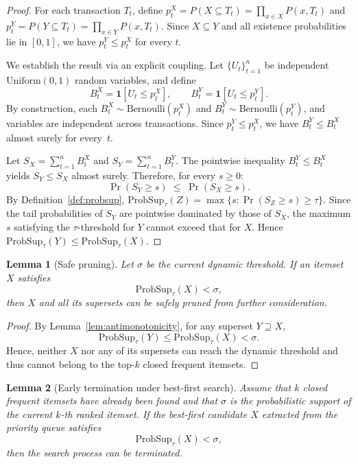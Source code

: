 \documentclass[10pt,letterpaper]{article}
\newtheorem{lemma}{Lemma}
\begin{document}
\begin{proof}
For each transaction $T_t$, define $p_t^X = P(X \subseteq T_t) = \prod_{x \in X} P(x, T_t)$ and $p_t^Y = P(Y \subseteq T_t) = \prod_{x \in Y} P(x, T_t)$. Since $X \subseteq Y$ and all existence probabilities lie in $[0,1]$, we have $p_t^Y \le p_t^X$ for every $t$.

We establish the result via an explicit coupling. Let $\{U_t\}_{t=1}^{n}$ be independent $\mathrm{Uniform}(0,1)$ random variables, and define
\[
B_t^X = \mathbf{1}[U_t \le p_t^X], \qquad B_t^Y = \mathbf{1}[U_t \le p_t^Y].
\]
By construction, each $B_t^X \sim \mathrm{Bernoulli}(p_t^X)$ and $B_t^Y \sim \mathrm{Bernoulli}(p_t^Y)$, and variables are independent across transactions. Since $p_t^Y \le p_t^X$, we have $B_t^Y \le B_t^X$ almost surely for every~$t$.

Let $S_X = \sum_{t=1}^{n} B_t^X$ and $S_Y = \sum_{t=1}^{n} B_t^Y$. The pointwise inequality $B_t^Y \le B_t^X$ yields $S_Y \le S_X$ almost surely. Therefore, for every $s \ge 0$:
\[
\Pr(S_Y \ge s) \;\le\; \Pr(S_X \ge s).
\]
By Definition~\ref{def:probsup}, $\mathrm{ProbSup}_{\tau}(Z) = \max\{s : \Pr(S_Z \ge s) \ge \tau\}$. Since the tail probabilities of $S_Y$ are pointwise dominated by those of $S_X$, the maximum $s$ satisfying the $\tau$-threshold for $Y$ cannot exceed that for $X$. Hence $\mathrm{ProbSup}_{\tau}(Y) \le \mathrm{ProbSup}_{\tau}(X)$.
\end{proof}

\begin{lemma}[Safe pruning]
\label{lem:safe_pruning}
Let $\sigma$ be the current dynamic threshold.  
If an itemset $X$ satisfies
\begin{equation}
\mathrm{ProbSup}_{\tau}(X) < \sigma,
\label{eq:safe_prune}
\end{equation}
then $X$ and all its supersets can be safely pruned from further consideration.
\end{lemma}

\begin{proof}
By Lemma~\ref{lem:antimonotonicity}, for any superset $Y \supseteq X$,
\[
\mathrm{ProbSup}_{\tau}(Y) \le \mathrm{ProbSup}_{\tau}(X) < \sigma.
\]
Hence, neither $X$ nor any of its supersets can reach the dynamic threshold and thus cannot belong to the top-$k$ closed frequent itemsets.
\end{proof}

\begin{lemma}[Early termination under best-first search]
\label{lem:early_termination}
Assume that $k$ closed frequent itemsets have already been found and that $\sigma$ is the probabilistic support of the current $k$-th ranked itemset.  
If the best-first candidate $X$ extracted from the priority queue satisfies
\begin{equation}
\mathrm{ProbSup}_{\tau}(X) < \sigma,
\label{eq:early_stop}
\end{equation}
then the search process can be terminated.
\end{lemma}
\end{document}
